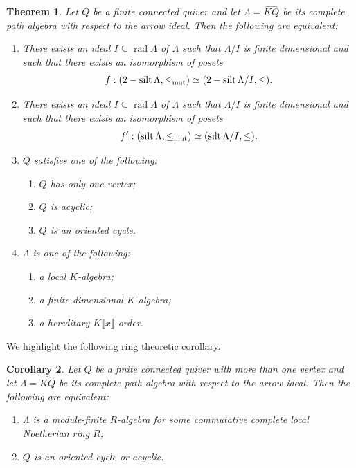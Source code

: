 \documentclass[11pt]{amsart}
\DeclareMathOperator{\rad}{\mathrm{rad}}
\DeclareMathOperator{\silt}{\mathrm{silt}}
\DeclareMathOperator{\twosilt}{\mathrm{2-silt}}
\newtheorem{theorem}{Theorem}[section]
\newtheorem{corollary}[theorem]{Corollary}
\theoremstyle{definition}
\begin{document}
\begin{theorem}\label{thm:main1}
    Let $Q$ be a finite connected quiver and let $\Lambda = \widehat{KQ}$ be its complete path algebra with respect to the arrow ideal. Then the following are equivalent:
    \begin{enumerate}
    \item\label{thm:main1eq1} There exists an ideal $I \subseteq \rad \Lambda$ of $\Lambda$ such that $\Lambda/I$ is finite dimensional and such that there exists an isomorphism of posets
    \[ f: (\twosilt \Lambda, \leq_{\textnormal{mut}}) \simeq (\twosilt \Lambda/I, \leq). \]
    \item\label{thm:main1eq2} There exists an ideal $I \subseteq \rad \Lambda$ of $\Lambda$ such that $\Lambda/I$ is finite dimensional and such that there exists an isomorphism of posets
    \[ f': (\silt \Lambda, \leq_{\textnormal{mut}}) \simeq (\silt \Lambda/I, \leq). \]
    \item\label{thm:main1eq3} $Q$ satisfies one of the following:
    \begin{enumerate}
        \item $Q$ has only one vertex;
        \item $Q$ is acyclic;
        \item $Q$ is an oriented cycle.
    \end{enumerate}
    \item\label{thm:main1eq4} $\Lambda$ is one of the following:
    \begin{enumerate}
    	\item a local $K$-algebra;
	\item a finite dimensional $K$-algebra;
	\item a hereditary $K \llbracket x \rrbracket$-order.
    \end{enumerate}   
    \end{enumerate}
\end{theorem}

We highlight the following ring theoretic corollary.

\begin{corollary}\label{cor:main1}
	Let $Q$ be a finite connected quiver with more than one vertex and let $\Lambda = \widehat{KQ}$ be its complete path algebra with respect to the arrow ideal. Then the following are equivalent:
	\begin{enumerate}
	\item\label{cor:main1eq1} $\Lambda$ is a module-finite $R$-algebra for some commutative complete local Noetherian ring $R$;
	\item\label{cor:main1eq2}  $Q$ is an oriented cycle or acyclic. 
	\end{enumerate}
\end{corollary}
\end{document}
